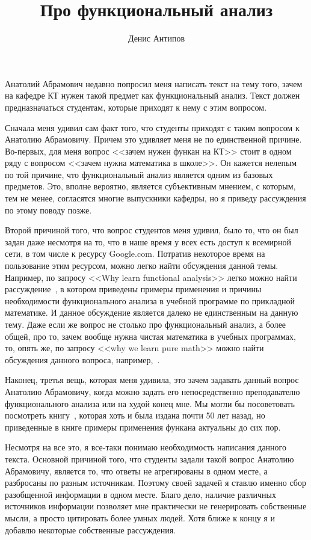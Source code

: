 \documentclass[russian]{article}
\title{Про функциональный анализ}
\author{Денис Антипов}
\begin{document}
\maketitle

Анатолий Абрамович недавно попросил меня написать текст на тему того, зачем на кафедре КТ нужен такой предмет как функциональный анализ. Текст должен предназначаться студентам, которые приходят к нему с этим вопросом.

Сначала меня удивил сам факт того, что студенты приходят с таким вопросом к Анатолию Абрамовичу. Причем это удивляет меня не по единственной причине. Во-первых, для меня вопрос <<зачем нужен функан на КТ>> стоит в одном ряду с вопросом <<зачем нужна математика в школе>>. Он кажется нелепым по той причине, что функциональный анализ является одним из базовых предметов. Это, вполне вероятно, является субъективным мнением, с которым, тем не менее, согласятся многие выпускники кафедры, но я приведу рассуждения по этому поводу позже.

Второй причиной того, что вопрос студентов меня удивил, было то, что он был задан даже несмотря на то, что в наше время у всех есть доступ к всемирной сети, в том числе к ресурсу Google.com. Потратив некоторое время на пользование этим ресурсом, можно легко найти обсуждения данной темы. Например, по запросу <<Why learn functional analysis>> легко можно найти рассуждение~\cite{why-funcan}, в котором приведены примеры применения и причины необходимости функционального анализа в учебной программе по прикладной математике. И данное обсуждение является далеко не единственным на данную тему. Даже если же вопрос не столько про функциональный анализ, а более общей, про то, зачем вообще нужна чистая математика в учебных программах, то, опять же, по запросу <<why we learn pure math>> можно найти обсуждения данного вопроса, например,~\cite{why-pure-math}.

Наконец, третья вещь, которая меня удивила, это зачем задавать данный вопрос Анатолию Абрамовичу, когда можно задать его непосредственно преподавателю функционального анализа или на худой конец мне. Мы могли бы посоветовать посмотреть книгу~\cite{kollats}, которая хоть и была издана почти 50 лет назад, но приведенные в книге примеры применения функана актуальны до сих пор.

Несмотря на все это, я все-таки понимаю необходимость написания данного текста. Основной причиной того, что студенты задали такой вопрос Анатолию Абрамовичу, является то, что ответы не агрегированы в одном месте, а разбросаны по разным источникам. Поэтому своей задачей я ставлю именно сбор разобщенной информации в одном месте. Благо дело, наличие различных источников информации позволяет мне практически не генерировать собственные мысли, а просто цитировать более умных людей. Хотя ближе к концу я и добавлю некоторые собственные рассуждения.
\end{document}
